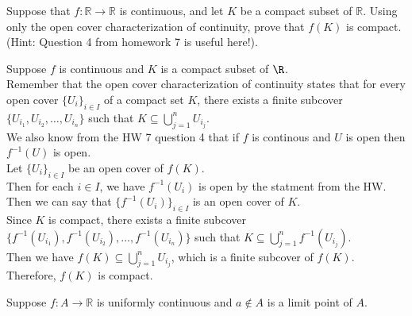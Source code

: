 \documentclass[answers,12pt,addpoints]{exam}
\begin{document}
\begin{questions}
    \question Suppose that \(f : \mathbb{R} \to \mathbb{R}\) is continuous, and let \(K\) be a compact subset of \(\mathbb{R}\). Using only the open cover characterization of continuity, prove that \(f(K)\) is compact. (Hint: Question 4 from homework 7 is useful here!).
    \begin{solution}
        Suppose $f$ is continuous and $K$ is a compact subset of $\R$.\\
        Remember that the open cover characterization of continuity states that for every open cover $\{U_i\}_{i \in I}$ of a compact set $K$, there exists a finite subcover $\{U_{i_1}, U_{i_2}, \ldots, U_{i_n}\}$ such that $K \subseteq \bigcup_{j=1}^n U_{i_j}$.\\
        We also know from the HW 7 question 4 that if $f$ is continous and $U$ is open then $f^{-1}(U)$ is open.\\
        Let $\{U_i\}_{i \in I}$ be an open cover of $f(K)$.\\
        Then for each $i \in I$, we have $f^{-1}(U_i)$ is open by the statment from the HW. \\
        Then we can say that $\{f^{-1}(U_i)\}_{i \in I}$ is an open cover of $K$.\\
        Since $K$ is compact, there exists a finite subcover $\{f^{-1}(U_{i_1}), f^{-1}(U_{i_2}), \ldots, f^{-1}(U_{i_n})\}$ such that $K \subseteq \bigcup_{j=1}^n f^{-1}(U_{i_j})$.\\
        Then we have $f(K) \subseteq \bigcup_{j=1}^n U_{i_j}$, which is a finite subcover of $f(K)$.\\
        Therefore, \(f(K)\) is compact.
    \end{solution}

    \question Suppose \(f : A \to \mathbb{R}\) is uniformly continuous and \(a \notin A\) is a limit point of \(A\).
\end{questions}
\end{document}
